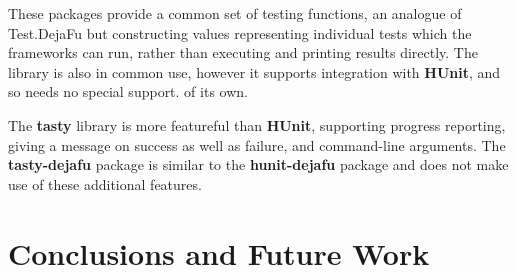 These packages provide a common set of testing functions, an analogue
of Test.DejaFu but constructing values representing individual tests
which the frameworks can run, rather than executing and printing
results directly.  The  library is also in
common use, however it supports integration with \textbf{HUnit}, and
so needs no special support. of its own.

The \textbf{tasty} library is more featureful than \textbf{HUnit},
supporting progress reporting, giving a message on success as well as
failure, and command-line arguments.  The \textbf{tasty-dejafu}
package is similar to the \textbf{hunit-dejafu} package and does not
make use of these additional features.

\section{Conclusions and Future Work}
\label{sec:dejafu-conclusions}

\blindtext
